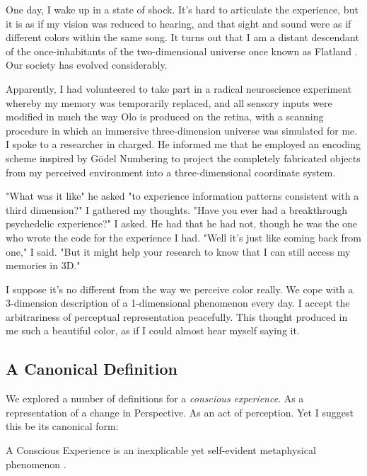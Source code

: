\documentclass[runningheads]{llncs}
\begin{document}
\begin{aexample}
One day, I wake up in a state of shock. It's hard to articulate the experience, but it is as if my vision was reduced to hearing, and that sight and sound were as if different colors within the same song. It turns out that I am a distant descendant of the once-inhabitants of the two-dimensional universe once known as Flatland \cite{Flatland1884}. Our society has evolved considerably.

Apparently, I had volunteered to take part in a radical neuroscience experiment whereby my memory was temporarily replaced, and all sensory inputs were modified in much the way Olo is produced on the retina, with a scanning procedure in which an immersive three-dimension universe was simulated for me. I spoke to a researcher in charged. He informed me that he employed an encoding scheme inspired by Gödel Numbering to project the completely fabricated objects from my perceived environment into a three-dimensional coordinate system. 

"What was it like" he asked "to experience information patterns consistent with a third dimension?" I gathered my thoughts. "Have you ever had a breakthrough psychedelic experience?" I asked. He had that he had not, though he was the one who wrote the code for the experience I had. "Well it's just like coming back from one," I said. "But it might help your research to know that I can still access my memories in 3D." 

I suppose it's no different from the way we perceive color really. We cope with a 3-dimension description of a 1-dimensional phenomenon every day. I accept the arbitrariness of perceptual representation peacefully. This thought produced in me such a beautiful color, as if I could almost hear myself saying it.   
\end{aexample}


\subsection{A Canonical Definition}

We explored a number of definitions for a \emph{conscious experience}. As a representation of a change in Perspective. As an act of perception. Yet I suggest this be its canonical form:

\begin{definition}
	A Conscious Experience is an inexplicable yet self-evident metaphysical phenomenon \cite{Formalism}.
\end{definition}
\end{document}
